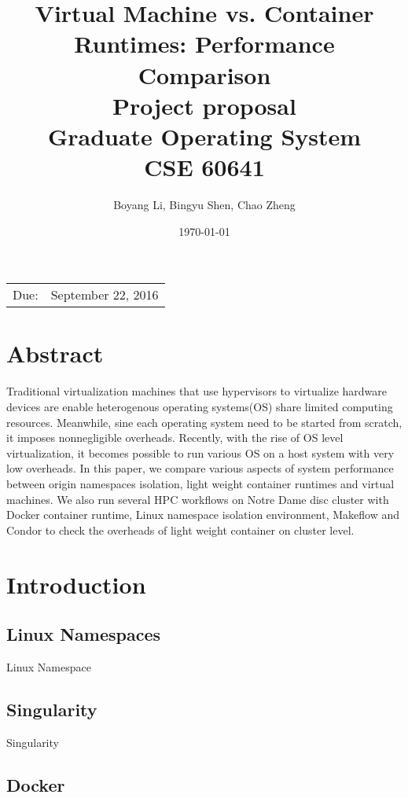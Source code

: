 \documentclass{article}
\title{{\textbf{Virtual Machine vs. Container Runtimes: Performance Comparison}} \\
       \vspace{3\baselineskip}
       {\large Project proposal} \\
       \vspace{3\baselineskip}
       {\large Graduate Operating System} \\ 
       {\large CSE 60641} %
      }
\date{\today} %
\author{Boyang Li, Bingyu Shen, Chao Zheng}
\begin{document}
\maketitle %

\begin{center}
\begin{tabular}{l r}
Due:& September 22, 2016\\ 
\end{tabular}
\end{center}
\nocite{*}

\pagebreak

\section{Abstract}

Traditional virtualization machines that use hypervisors to virtualize hardware devices are 
enable heterogenous operating systems(OS) share limited computing resources. Meanwhile, sine each 
operating system need to be started from scratch, it imposes nonnegligible overheads. Recently, 
with the rise of OS level virtualization, it becomes possible to run various OS on a host system 
with very low overheads. In this paper, we compare various aspects of system performance between 
origin namespaces isolation, light weight container runtimes and virtual machines. We also run several
HPC workflows on Notre Dame disc cluster with Docker container runtime\cite{dockerwb}, Linux namespace
isolation environment, Makeflow\cite{albrecht2012makeflow} and Condor\cite{thain2003condor} to check the 
overheads of light weight container on cluster level.  

\section{Introduction}

\subsection{Linux Namespaces}

Linux Namespace\cite{rosen2013resource}

\subsection{Singularity}

Singularity\cite{singularity}

\subsection{Docker}
\end{document}
